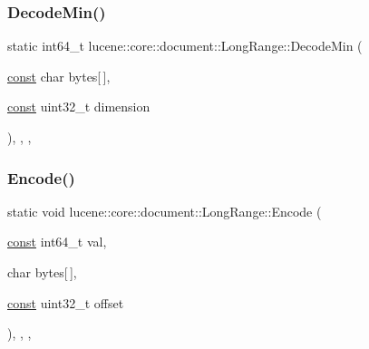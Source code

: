 \mbox{\label{classlucene_1_1core_1_1document_1_1LongRange_ac11a9f4800961cf1edaad2ba9d77c5f5}} 
\subsubsection{\texorpdfstring{Decode\+Min()}{DecodeMin()}}
{\footnotesize\ttfamily static int64\+\_\+t lucene\+::core\+::document\+::\+Long\+Range\+::\+Decode\+Min (\begin{DoxyParamCaption}\item[{\mbox{\hyperlink{ZlibCrc32_8h_a2c212835823e3c54a8ab6d95c652660e}{const}} char}]{bytes\mbox{[}$\,$\mbox{]},  }\item[{\mbox{\hyperlink{ZlibCrc32_8h_a2c212835823e3c54a8ab6d95c652660e}{const}} uint32\+\_\+t}]{dimension }\end{DoxyParamCaption})\hspace{0.3cm}{\ttfamily [inline]}, {\ttfamily [static]}, {\ttfamily [private]}, {\ttfamily [noexcept]}}

\mbox{\label{classlucene_1_1core_1_1document_1_1LongRange_a3b63010820b45954c66489d43ee75321}} 
\subsubsection{\texorpdfstring{Encode()}{Encode()}}
{\footnotesize\ttfamily static void lucene\+::core\+::document\+::\+Long\+Range\+::\+Encode (\begin{DoxyParamCaption}\item[{\mbox{\hyperlink{ZlibCrc32_8h_a2c212835823e3c54a8ab6d95c652660e}{const}} int64\+\_\+t}]{val,  }\item[{char}]{bytes\mbox{[}$\,$\mbox{]},  }\item[{\mbox{\hyperlink{ZlibCrc32_8h_a2c212835823e3c54a8ab6d95c652660e}{const}} uint32\+\_\+t}]{offset }\end{DoxyParamCaption})\hspace{0.3cm}{\ttfamily [inline]}, {\ttfamily [static]}, {\ttfamily [private]}, {\ttfamily [noexcept]}}


